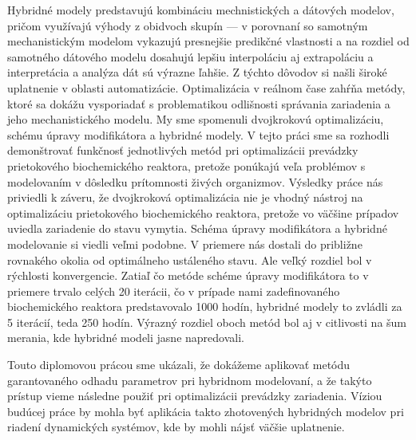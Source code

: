 Hybridné modely predstavujú kombináciu mechnistických a dátových modelov, pričom využívajú výhody z obidvoch skupín --- v porovnaní so samotným mechanistickým modelom vykazujú presnejšie predikčné vlastnosti a na rozdiel od samotného dátového modelu dosahujú lepšiu interpoláciu aj extrapoláciu a interpretácia a analýza dát sú výrazne ľahšie. Z týchto dôvodov si našli široké uplatnenie v oblasti automatizácie. Optimalizácia v reálnom čase zahŕňa metódy, ktoré sa dokážu vysporiadať s problematikou odlišnosti správania zariadenia a jeho mechanistického modelu. My sme spomenuli dvojkrokovú optimalizáciu, schému úpravy modifikátora a hybridné modely. V tejto práci sme sa rozhodli demonštrovať funkčnosť jednotlivých metód pri optimalizácii prevádzky prietokového biochemického reaktora, pretože ponúkajú veľa problémov s modelovaním v dôsledku prítomnosti živých organizmov. Výsledky práce nás priviedli k záveru, že dvojkroková optimalizácia nie je vhodný nástroj na optimalizáciu prietokového biochemického reaktora, pretože vo väčšine prípadov uviedla zariadenie do stavu vymytia. Schéma úpravy modifikátora a hybridné modelovanie si viedli veľmi podobne. V priemere nás dostali do približne rovnakého okolia od optimálneho ustáleného stavu. Ale veľký rozdiel bol v rýchlosti konvergencie. Zatiaľ čo metóde schéme úpravy modifikátora to v priemere trvalo celých 20 iterácii, čo v prípade nami zadefinovaného biochemického reaktora predstavovalo 1000 hodín, hybridné modely to zvládli za 5 iterácií, teda 250 hodín. Výrazný rozdiel oboch metód bol aj v citlivosti na šum merania, kde hybridné modeli jasne napredovali.

Touto diplomovou prácou sme ukázali, že dokážeme aplikovať metódu garantovaného odhadu parametrov pri hybridnom modelovaní, a že takýto prístup vieme následne použiť pri optimalizácii prevádzky zariadenia. Víziou budúcej práce by mohla byť aplikácia takto zhotovených hybridných modelov pri riadení dynamických systémov, kde by mohli nájsť väčšie uplatnenie.  

